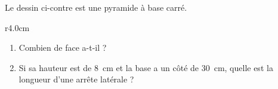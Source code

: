 
\begin{exercice}\label{exo2smath-0180}


Le dessin ci-contre est une pyramide à base carré.
\begin{wrapfigure}{r}{4.0cm}
   \centering
   
\end{wrapfigure}
\begin{enumerate}
    \item
Combien de face a-t-il ?
    \item
        Si sa hauteur est de \SI{8}{\centi\meter} et la base a un côté de \SI{30}{\centi\meter}, quelle est la longueur d'une arrête latérale ?
\end{enumerate}

\end{exercice}
